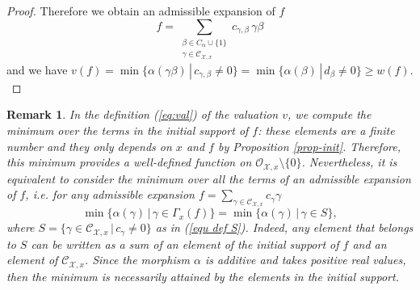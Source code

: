 \documentclass{amsart}%
\numberwithin{equation}{subsection}
\theoremstyle{plain2}
\theoremstyle{definition2}
\newtheorem{rem}[equation]{Remark}
\theoremstyle{stepstyle}
\theoremstyle{point}
\theoremstyle{subpoint}
\newcommand{\cX}{\ensuremath{\mathscr{X}}}
\newcommand{\caC}{\ensuremath{\mathcal{C}}}
\newcommand{\caO}{\ensuremath{\mathcal{O}}}
\begin{document}
\begin{proof}
Therefore we obtain an admissible expansion of $f$ $$f = \sum_{\substack{\beta \in C_\alpha \cup \{1\} \\ \gamma \in \caC_{\cX,x}}}c_{\gamma, \beta}\, \gamma\beta $$ and we have $v(f)=\min\{\alpha(\gamma \beta)\,|\,c_{\gamma, \beta}\neq 0\}=\min\{\alpha(\beta)\,|\,d_{\beta}\neq 0\} \geq w(f).$
\end{proof}
 
\begin{rem} \label{rem def-val}
In the definition (\ref{eq:val}) of the valuation $v$, we compute the minimum over the terms in the initial support of $f$: these elements are a finite number and they only depends on $x$ and $f$ by Proposition \ref{prop-init}. Therefore, this minimum provides a well-defined function on $\caO_{\cX,x} \setminus \{0\}$. Nevertheless, it is equivalent to consider the minimum over all the terms of an admissible expansion of $f$, i.e. for any admissible expansion $f=\sum_{\gamma \in \mathcal{C}_{\cX,x}}c_{\gamma}\gamma$ $$\min\{\alpha(\gamma)\,|\,\gamma\in \Gamma_x(f)\} = \min\{\alpha(\gamma)\,|\,\gamma\in S\},$$ where $S=\{\gamma\in\mathcal{C}_{\cX,x}\,|\,c_\gamma\neq 0\}$ as in (\ref{equ def S}). Indeed, any element that belongs to $S$ can be written as a sum of an element of the initial support of $f$ and an element of $\caC_{\cX,x}$. Since the morphism $\alpha$ is additive and takes positive real values, then the minimum is necessarily attained by the elements in the initial support.
\end{rem}
\end{document}
